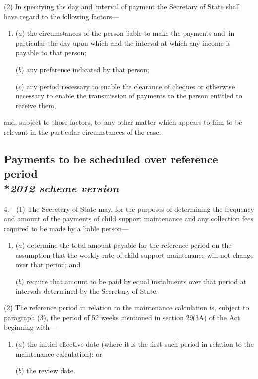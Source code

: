 \documentclass[12pt,a4paper]{article}
\begin{document}
(2) In specifying the day and~interval of payment the Secretary of State shall have regard to the following factors—
\begin{enumerate}\item[]
($a$) the circumstances of the person liable to make the payments and~in particular the day upon which and the interval at which any income is payable to that person;

($b$) any preference indicated by that person;

($c$) any period necessary to enable the clearance of cheques or otherwise necessary to enable the transmission of payments to the person entitled to receive them,
\end{enumerate}
and, subject to those factors, to~any other matter which appears to him to be relevant in the particular circumstances of the case.


\subsection[4. Payments to be scheduled over reference period --- \emph{2012 scheme version}]{Payments to be scheduled over reference period\\*\emph{2012 scheme version}}

4.---(1)  The Secretary of State may, for the purposes of determining the frequency and amount of the payments of child support maintenance 
and any collection fees  %
required to be made by a liable person—
\begin{enumerate}\item[]
($a$) determine the total amount payable for the reference period on the assumption that the weekly rate of child support maintenance will not change over that period; and

($b$) require that amount to be paid by equal instalments over that period at intervals determined by the Secretary of State.
\end{enumerate}

(2) The reference period in relation to the maintenance calculation is, subject to paragraph (3), the period of 52 weeks mentioned in section 29(3A) of the Act beginning with—
\begin{enumerate}\item[]
($a$) the initial effective date (where it is the first such period in relation to the maintenance calculation); or

($b$) the review date.
\end{enumerate}
\end{document}

